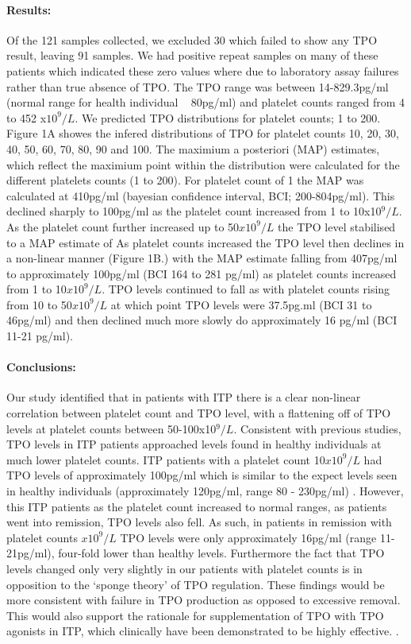 \documentclass[11pt]{article}
\begin{document}
\paragraph{Results:} Of the 121 samples collected, we excluded 30 which failed to show any TPO result, leaving 91 samples. We had positive repeat samples on many of these patients which indicated these zero values where due to laboratory assay failures rather than true absence of TPO. The TPO range was between 14-829.3pg/ml (normal range for health individual ~ 80pg/ml) and platelet counts ranged from 4 to 452 x$10^9/L$.  We predicted TPO distributions for platelet counts; 1 to 200. Figure 1A showes the infered distributions of TPO for platelet counts 10, 20, 30, 40, 50, 60, 70, 80, 90 and 100. The maximium a posteriori (MAP) estimates, which reflect the maximium point within the distribution were calculated for the different platelets counts (1 to 200). For platelet count of 1 the MAP was calculated at 410pg/ml (bayesian confidence interval, BCI; 200-804pg/ml). This declined sharply to 100pg/ml as the platelet count increased from 1 to 10x10$^9/L$. As the platelet count further increased up to 50$x10^9/L$ the TPO level stabilised to a MAP estimate of  As platelet counts increased the TPO level then declines in a non-linear manner (Figure 1B.) with the MAP estimate falling from 407pg/ml to approximately 100pg/ml (BCI 164 to 281 pg/ml) as platelet counts increased from 1 to 10$x10^9/L$. TPO levels continued to fall as with platelet counts rising from 10 to 50$x10^9/L$ at which point TPO levels were 37.5pg.ml (BCI 31 to 46pg/ml) and then declined much more slowly do approximately 16 pg/ml (BCI 11-21 pg/ml).

\paragraph{Conclusions:} Our study identified that in patients with ITP there is a clear non-linear correlation between platelet count and TPO level, with a flattening off of TPO levels at platelet counts between 50-100x10$^9/L$. Consistent with previous studies, TPO levels in ITP patients approached levels found in healthy individuals at much lower platelet counts. ITP patients with a platelet count 10$x10^9/L$ had TPO levels of approximately 100pg/ml which is similar to the expect levels seen in healthy individuals (approximately 120pg/ml, range 80 - 230pg/ml) \cite{SinghCirculatingthrombopoietinlevels2015}. However, this ITP patients as the platelet count increased to normal ranges, as patients went into remission, TPO levels also fell. As such, in patients in remission with platelet counts $x10^9/L$ TPO levels were only approximately 16pg/ml (range 11-21pg/ml), four-fold lower than healthy levels. Furthermore the fact that TPO levels changed only very slightly in our patients with platelet counts  is in opposition to the `sponge theory' of TPO regulation. These findings would be more consistent with failure in TPO production as opposed to excessive removal. This would also support the rationale for supplementation of TPO with TPO agonists in ITP, which clinically have been demonstrated to be highly effective.  \cite{WangEfficacysafetythrombopoietin2016}.
\end{document}
